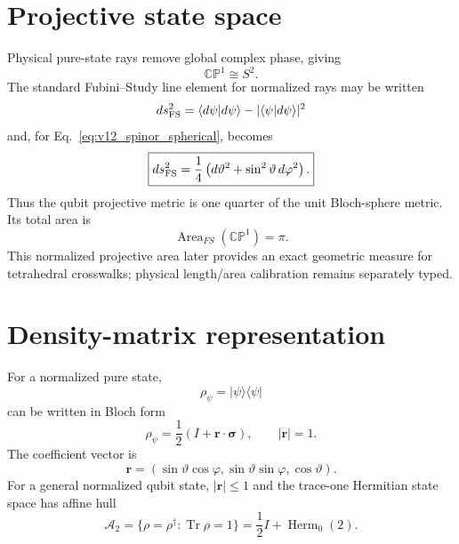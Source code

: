 \section{Projective state space}

Physical pure-state rays remove global complex phase, giving
\begin{equation}
\boxed{\mathbb{CP}^1\cong S^2.}
\label{eq:v12_cp1_s2}
\end{equation}
The standard Fubini--Study line element for normalized rays may be written
\begin{equation}
 ds_{\rm FS}^2
=\langle d\psi|d\psi\rangle
-|\langle\psi|d\psi\rangle|^2
\label{eq:v12_fs_general}
\end{equation}
and, for Eq.~\eqref{eq:v12_spinor_spherical}, becomes
\begin{equation}
\boxed{
 ds_{\rm FS}^2
=\frac14\left(d\vartheta^2+\sin^2\vartheta\,d\varphi^2\right).
}
\label{eq:v12_fs_qubit}
\end{equation}
Thus the qubit projective metric is one quarter of the unit Bloch-sphere metric. Its total area is
\begin{equation}
\boxed{\operatorname{Area}_{FS}(\mathbb{CP}^1)=\pi.}
\end{equation}
This normalized projective area later provides an exact geometric measure for tetrahedral crosswalks; physical length/area calibration remains separately typed.

\section{Density-matrix representation}

For a normalized pure state,
\begin{equation}
\rho_\psi=|\psi\rangle\langle\psi|
\end{equation}
can be written in Bloch form
\begin{equation}
\boxed{
\rho_\psi
=\frac12\left(I+\mathbf r\cdot\boldsymbol\sigma\right),
\qquad
|\mathbf r|=1.
}
\label{eq:v12_bloch_density}
\end{equation}
The coefficient vector is
\begin{equation}
\mathbf r
=(\sin\vartheta\cos\varphi,
\sin\vartheta\sin\varphi,
\cos\vartheta).
\end{equation}
For a general normalized qubit state, $|\mathbf r|\le1$ and the trace-one Hermitian state space has affine hull
\begin{equation}
\boxed{
\mathcal A_2
=\{\rho=\rho^\dagger:\operatorname{Tr}\rho=1\}
=\frac12I+\operatorname{Herm}_0(2).
}
\label{eq:v12_affine_qubit_hull}
\end{equation}

